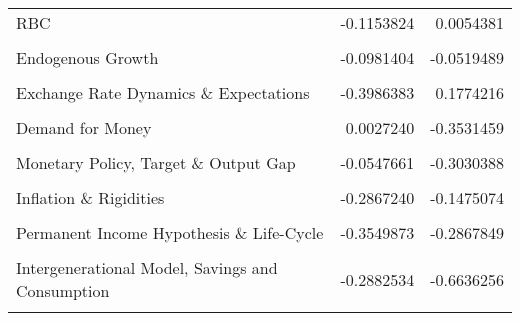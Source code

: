 \documentclass[
  12pt,
  onecolumn]{article}
\begin{document}
\begin{table}[!h]
{\begin{tabular}[t]{lrr}
RBC & -0.1153824 & 0.0054381\\
\cellcolor{gray!6}{Coordination \& Sunspots 1} & \cellcolor{gray!6}{0.0664730} & \cellcolor{gray!6}{-0.2082945}\\
Endogenous Growth & -0.0981404 & -0.0519489\\
\addlinespace
\cellcolor{gray!6}{REH, Monetary Policy \& Business Cycles} & \cellcolor{gray!6}{-0.2171467} & \cellcolor{gray!6}{-0.0007970}\\
Exchange Rate Dynamics \& Expectations & -0.3986383 & 0.1774216\\
\cellcolor{gray!6}{Inflation, Interest Rates \& Expectations} & \cellcolor{gray!6}{-0.1050581} & \cellcolor{gray!6}{-0.1682303}\\
Demand for Money & 0.0027240 & -0.3531459\\
\cellcolor{gray!6}{Monetary Approach of Balance of Payments} & \cellcolor{gray!6}{-0.2916010} & \cellcolor{gray!6}{-0.0590268}\\
\addlinespace
Monetary Policy, Target \& Output Gap & -0.0547661 & -0.3030388\\
\cellcolor{gray!6}{Credit Rationing, Rational Expectations \& Imperfect Information} & \cellcolor{gray!6}{-0.1598390} & \cellcolor{gray!6}{-0.2050900}\\
Inflation \& Rigidities & -0.2867240 & -0.1475074\\
\cellcolor{gray!6}{New Theory of Money: Search, Bargaining...} & \cellcolor{gray!6}{-0.1669925} & \cellcolor{gray!6}{-0.3648415}\\
Permanent Income Hypothesis \& Life-Cycle & -0.3549873 & -0.2867849\\
\addlinespace
\cellcolor{gray!6}{Monetary Economics \& Demand for Money} & \cellcolor{gray!6}{-0.2531023} & \cellcolor{gray!6}{-0.4754408}\\
Intergenerational Model, Savings and Consumption & -0.2882534 & -0.6636256\\
\cellcolor{gray!6}{Marginal Taxation} & \cellcolor{gray!6}{-0.3048880} & \cellcolor{gray!6}{-0.9756722}\\
\bottomrule
\end{tabular}}
\end{table}
\end{document}
